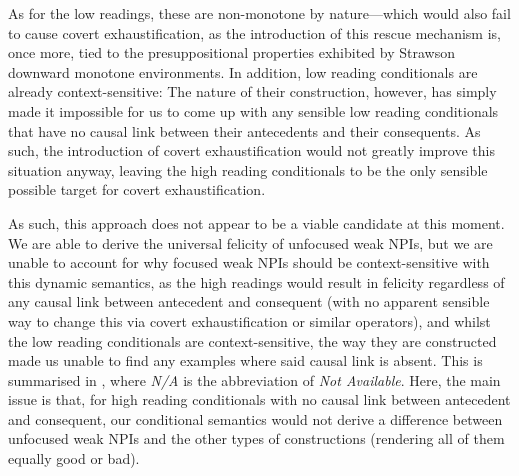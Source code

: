 As for the low readings, these are non-monotone by nature---which would also fail to cause covert exhaustification, as the introduction of this rescue mechanism is, once more, tied to the presuppositional properties exhibited by Strawson downward monotone environments. In addition, low reading conditionals are already context-sensitive: The nature of their construction, however, has simply made it impossible for us to come up with any sensible low reading conditionals that have no causal link between their antecedents and their consequents. As such, the introduction of covert exhaustification would not greatly improve this situation anyway, leaving the high reading conditionals to be the only sensible possible target for covert exhaustification.

As such, this approach does not appear to be a viable candidate at this moment. We are able to derive the universal felicity of unfocused weak NPIs, but we are unable to account for why focused weak NPIs should be context-sensitive with this dynamic semantics, as the high readings would result in felicity regardless of any causal link between antecedent and consequent (with no apparent sensible way to change this via covert exhaustification or similar operators), and whilst the low reading conditionals are context-sensitive, the way they are constructed made us unable to find any examples where said causal link is absent. This is summarised in , where \textit{N/A} is the abbreviation of \textit{Not Available}. Here, the main issue is that, for high reading conditionals with no causal link between antecedent and consequent, our conditional semantics would not derive a difference between unfocused weak NPIs and the other types of constructions (rendering all of them equally good or bad).
